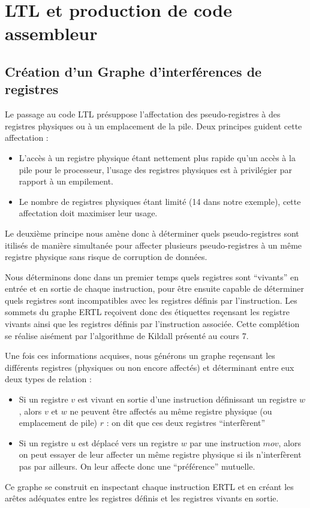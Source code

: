 \section{LTL et production de code assembleur}
\subsection{Cr\'eation d'un Graphe d'interf\'erences de registres}

Le passage au code LTL pr\'esuppose l'affectation des pseudo-registres \`a des registres physiques ou \`a un emplacement de la pile. Deux principes guident cette affectation :
\begin{itemize}
\item L'acc\`es \`a un registre physique \'etant nettement plus rapide qu'un acc\`es \`a la pile pour le processeur, l'usage des registres physiques est \`a privil\'egier par rapport \`a un empilement.
\item Le nombre de registres physiques \'etant limit\'e (14 dans notre exemple), cette affectation doit maximiser leur usage.
\end{itemize}

Le deuxi\`eme principe nous am\`ene donc \`a d\'eterminer quels pseudo-registres sont itilis\'es de mani\`ere simultan\'ee pour affecter plusieurs pseudo-registres \`a un même registre physique sans risque de corruption de donn\'ees.

Nous d\'eterminons donc dans un premier temps quels registres sont ``vivants'' en entr\'ee et en sortie de chaque instruction, pour être ensuite capable de d\'eterminer quels registres sont incompatibles avec les registres d\'efinis par l'instruction. Les sommets du graphe ERTL reçoivent donc des \'etiquettes reçensant les registre vivants ainsi que les registres d\'efinis par l'instruction associ\'ee. Cette compl\'etion se r\'ealise ais\'ement par l'algorithme de Kildall pr\'esent\'e au cours 7.

Une fois ces informations acquises, nous g\'en\'erons un graphe reçensant les diff\'erents registres (physiques ou non encore affect\'es) et d\'eterminant entre eux deux types de relation :
\begin{itemize}
\item Si un registre $v$ est vivant en sortie d'une instruction d\'efinissant un registre $w$, alors $v$ et $w$ ne peuvent être affect\'es au même registre physique (ou emplacement de pile) $r$ : on dit que ces deux registres ``interf\`erent''
\item Si un registre $u$ est d\'eplac\'e vers un registre $w$ par une instruction $mov$, alors on peut essayer de leur affecter un même registre physique si ils n'interf\`erent pas par ailleurs. On leur affecte donc une ``pr\'ef\'erence'' mutuelle.
\end{itemize}
Ce graphe se construit en inspectant chaque instruction ERTL et en cr\'eant les arêtes ad\'equates entre les registres d\'efinis et les registres vivants en sortie.

